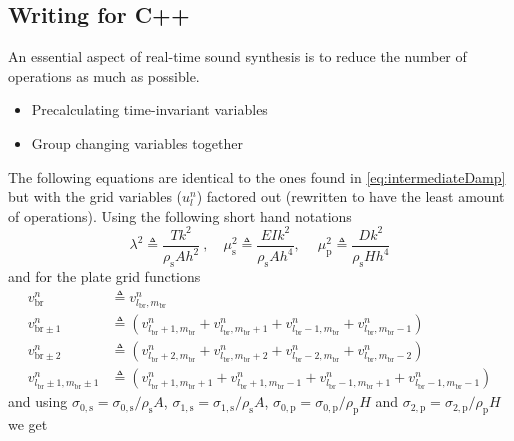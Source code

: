 \documentclass{article}
\begin{document}
\subsection{Writing for C++}
An essential aspect of real-time sound synthesis is to reduce the number of operations as much as possible. 
\begin{itemize}
    \item Precalculating time-invariant variables
    \item Group changing variables together
\end{itemize}
The following equations are identical to the ones found in \eqref{eq:intermediateDamp} but with the grid variables ($u_l^n$) factored out (rewritten to have the least amount of operations). Using the following short hand notations
\begin{equation}
\lambda^2 \triangleq \frac{Tk^2}{\rho_\text{s}Ah^2}\ , \quad \mu_\text{s}^2 \triangleq \frac{EIk^2}{\rho_\text{s}Ah^4},\ \quad \mu_\text{p}^2 \triangleq \frac{Dk^2}{\rho_\text{s}Hh^4}
\end{equation}
and for the plate grid functions
\begin{equation}
    \begin{aligned}
    v_\text{br}^n &\triangleq v_{l_\text{br},m_\text{br}}^n\\
    v_{\text{br}\pm1}^n &\triangleq (v_{l_\text{br}+1,m_\text{br}}^n+v_{l_\text{br},m_\text{br}+1}^n+v_{l_\text{br}-1,m_\text{br}}^n+v_{l_\text{br},m_\text{br}-1}^n)\\
    v_{\text{br}\pm 2}^n &\triangleq (v_{l_\text{br}+2,m_\text{br}}^n+v_{l_\text{br},m_\text{br}+2}^n+v_{l_\text{br}-2,m_\text{br}}^n+v_{l_\text{br},m_\text{br}-2}^n)\\
    v_{l_\text{br}\pm1, m_\text{br}\pm1}^n &\triangleq (v_{l_\text{br}+1,m_\text{br}+1}^n+v_{l_\text{br}+1,m_\text{br}-1}^n+v_{l_\text{br}-1,m_\text{br}+1}^n+v_{l_\text{br}-1,m_\text{br}-1}^n)
    \end{aligned}
\end{equation}
and using $\sigma_{0,\text{s}} = \sigma_{0,\text{s}} / \rho_\text{s}A$, $\sigma_{1,\text{s}} = \sigma_{1,\text{s}} / \rho_\text{s}A$, $\sigma_{0,\text{p}}  = \sigma_{0,\text{p}} / \rho_\text{p}H$ and $\sigma_{2,\text{p}}  = \sigma_{2,\text{p}} / \rho_\text{p}H$ we get
\end{document}

